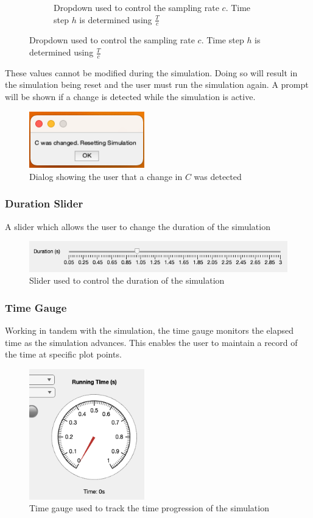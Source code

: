 \begin{figure}[H]
\begin{subfigure}[b]{0.3\textwidth}
     	\caption{Dropdown used to control the sampling rate $c$. Time step $h$ is determined using $\frac{T}{c}$}
     \end{subfigure}
     \hfill
\end{figure}
These values cannot be modified during the simulation. Doing so will result in the simulation being reset and the user must run the simulation again. A prompt will be shown if a change is detected while the simulation is active.
\begin{figure}[H]
     \centering
     \includegraphics[width=5cm]{graphics/visualisation/dialog_cchange}
     \caption{Dialog showing the user that a change in $C$ was detected}
\end{figure}

\pagebreak
\subsubsection{Duration Slider} A slider which allows the user to change the duration of the simulation 

\begin{figure}[H]
    \centering
   	\includegraphics[width=\textwidth]{graphics/visualisation/ui_input_duration}
	\caption{Slider used to control the duration of the simulation}
\end{figure}

\subsubsection{Time Gauge} Working in tandem with the simulation, the time gauge monitors the elapsed time as the simulation advances. This enables the user to maintain a record of the time at specific plot points.

\begin{figure}[H]
    \centering
   	\includegraphics[width=5cm]{graphics/visualisation/ui_indicator_gage}
	\caption{Time gauge used to track the time progression of the simulation}
\end{figure}

